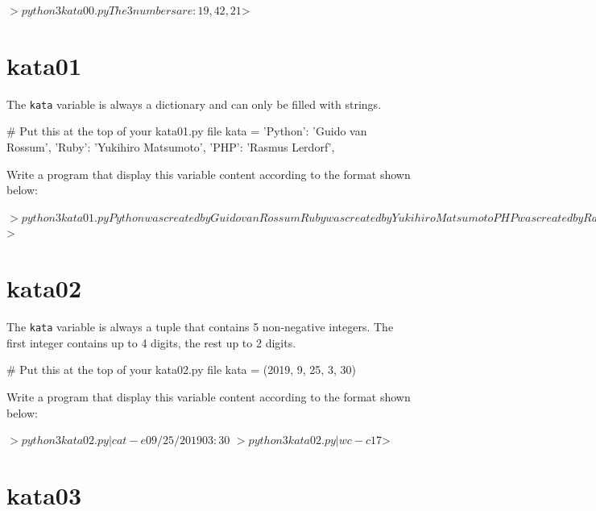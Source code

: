\documentclass{42-en}
\begin{document}
\begin{42console}
$> python3 kata00.py
The 3 numbers are: 19, 42, 21
$>
\end{42console}

\section*{kata01}

The \texttt{kata} variable is always a dictionary and can only be filled with strings.

\begin{42console}
# Put this at the top of your kata01.py file
kata = {
    'Python': 'Guido van Rossum',
    'Ruby': 'Yukihiro Matsumoto',
    'PHP': 'Rasmus Lerdorf',
    }
\end{42console}

Write a program that display this variable content according to the format shown below:

\begin{42console}
$> python3 kata01.py
Python was created by Guido van Rossum
Ruby was created by Yukihiro Matsumoto
PHP was created by Rasmus Lerdorf
$>
\end{42console}

\section*{kata02}

The \texttt{kata} variable is always a tuple that contains 5 non-negative integers. The first integer contains up to 4 digits, the rest up to 2 digits.

\begin{42console} 
# Put this at the top of your kata02.py file
kata = (2019, 9, 25, 3, 30)
\end{42console}

Write a program that display this variable content according to the format shown below:

\begin{42console}
$> python3 kata02.py | cat -e
09/25/2019 03:30$
$> python3 kata02.py | wc -c
17
$>
\end{42console}

\section*{kata03}
\end{document}
